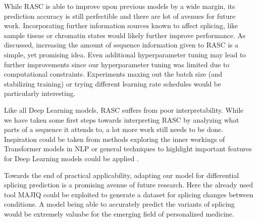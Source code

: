 While RASC is able to improve upon previous models by a wide margin, its prediction accuracy is still perfectible and there are lot of avenues for future work. 
Incorporating further information sources known to affect splicing, like sample tissue or chromatin states \cite{chromatin} would likely further improve performance. As discussed, increasing the amount of sequence information given to RASC is a simple, yet promising idea. 
Even additional hyperparameter tuning may lead to further improvements since our hyperparameter tuning was limited due to computational constraints. Experiments maxing out the batch size (and stabilizing training) or trying different learning rate schedules would be particularly interesting. 

Like all Deep Learning models, RASC suffers from poor interpretability. While we have taken some first steps towards interpreting RASC by analyzing what parts of a sequence it attends to, a lot more work still needs to be done. Inspiration could be taken from methods exploring the inner workings of Transformer models in NLP \cite{interpretingbert} or general techniques to highlight important features for Deep Learning models could be applied \cite{deeplift}. 

Towards the end of practical applicability, adapting our model for differential splicing prediction is a promising avenue of future research. Here the already used tool MAJIQ could be exploited to generate a dataset for splicing changes between conditions. A model being able to accurately predict the variants of splicing would be extremely valuabe for the emerging field of personalized medicine.




%
%
% 
%
%
